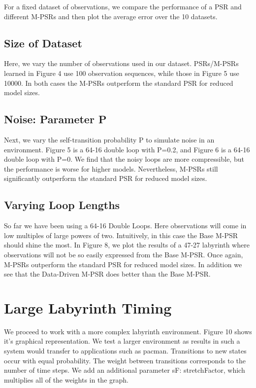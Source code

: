 For a fixed dataset of observations, we compare the performance of a PSR and different M-PSRs and then plot the average error over the 10 datasets.

\subsection{Size of Dataset}

Here, we vary the number of observations used in our dataset. PSRs/M-PSRs learned in Figure 4 use 100 observation sequences, while those in Figure 5 use 10000. In both cases the M-PSRs outperform the standard PSR for reduced model sizes.

\subsection{Noise: Parameter P}

Next, we vary the self-transition probability P to simulate noise in an environment. Figure 5 is a 64-16 double loop with P=0.2, and Figure 6 is a 64-16 double loop with P=0. We find that the noisy loops are more compressible, but the performance is worse for higher models. Nevertheless, M-PSRs still significantly outperform the standard PSR for reduced model sizes.

\subsection{Varying Loop Lengths}

So far we have been using a 64-16 Double Loops. Here observations will come in low multiples of large powers of two. Intuitively, in this case the Base M-PSR should shine the most. In Figure 8, we plot the results of a 47-27 labyrinth where observations will not be so easily expressed from the Base M-PSR. Once again, M-PSRs outperform the standard PSR for reduced model sizes. In addition we see that the Data-Driven M-PSR does better than the Base M-PSR.

\section{Large Labyrinth Timing}

We proceed to work with a more complex labyrinth environment. Figure 10 shows it's graphical representation. We test a larger environment as results in such a system would transfer to applications such as pacman. Transitions to new states occur with equal probability. The weight between transitions corresponds to the number of time steps. We add an additional parameter sF: stretchFactor, which multiplies all of the weights in the graph. 

